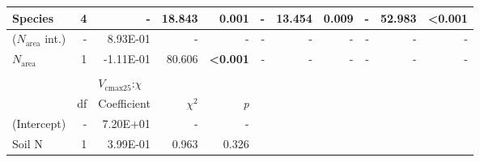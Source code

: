 \begin{landscape}
\begin{table}[]
{\begin{tabular}{p{2.5cm}p{0.5cm}p{2cm}p{1.5cm}p{1.5cm}p{2cm}p{1.5cm}p{1.5cm}p{2cm}p{1.5cm}p{1.5cm}}
                 Species & \multicolumn{1}{r}{4}
                 & \multicolumn{1}{r}{-} & \multicolumn{1}{r}{18.843} & \multicolumn{1}{r}{\textbf{0.001}}
                 & \multicolumn{1}{r}{-} & \multicolumn{1}{r}{13.454} & \multicolumn{1}{r}{\textbf{0.009}}
                 & \multicolumn{1}{r}{-} & \multicolumn{1}{r}{52.983} & \multicolumn{1}{r}{\textbf{\textless{}0.001}}
                 \\
                 \hline

                 ($N_\mathrm{area}$ int.) & \multicolumn{1}{r}{-}
                 & \multicolumn{1}{r}{8.93E-01}  & \multicolumn{1}{r}{-}    & \multicolumn{1}{r}{-}
                 & \multicolumn{1}{r}{-}         & \multicolumn{1}{r}{-}    & \multicolumn{1}{r}{-}
                 & \multicolumn{1}{r}{-}         & \multicolumn{1}{r}{-}    & \multicolumn{1}{r}{-}
                 \\

                 $N_\mathrm{area}$ & \multicolumn{1}{r}{1}
                 & \multicolumn{1}{r}{-1.11E-01}  & \multicolumn{1}{r}{80.606}  & \multicolumn{1}{r}{\textbf{\textless{}0.001}}
                 & \multicolumn{1}{r}{-}        & \multicolumn{1}{r}{-}       & \multicolumn{1}{r}{-}
                 & \multicolumn{1}{r}{-}          & \multicolumn{1}{r}{-}       & \multicolumn{1}{r}{-}
                 \\
                 \hline

                 &&&&&&&&&&
                 \\

                 && \multicolumn{3}{l}{$V_{\mathrm{cmax25}}$:$\chi$} &&&&& \\
                 \hline
                 & \multicolumn{1}{r}{df}
                 & \multicolumn{1}{r}{Coefficient} & \multicolumn{1}{r}{$\chi^{2}$} & \multicolumn{1}{r}{\textit{p}} 
                 \\
                 \hline

                 (Intercept) & \multicolumn{1}{r}{-}
                 & \multicolumn{1}{r}{7.20E+01} & \multicolumn{1}{r}{-} & \multicolumn{1}{r}{-}
                 &&&&&&
                 \\

                 Soil N & \multicolumn{1}{r}{1}
                 & \multicolumn{1}{r}{3.99E-01}  & \multicolumn{1}{r}{0.963} & \multicolumn{1}{r}{0.326}
                 &&&&&& 
                 \\


\end{tabular}}
\end{table}
\end{landscape}
